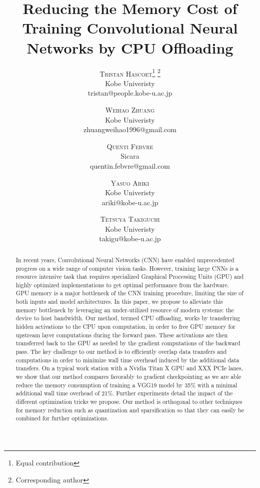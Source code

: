 \documentclass[11pt,onecolumn]{article}
\title{Reducing the Memory Cost of Training Convolutional Neural Networks by CPU Offloading} %
\author{%
	\textsc{Tristan Hascoet}\thanks{Equal contribution} \thanks{Corresponding author} \\ %
	\normalsize Kobe Univeristy \\ %
	\normalsize tristan@people.kobe-u.ac.jp %
	\and %
	\textsc{Weihao Zhuang}\footnotemark[1] \\ %
	\normalsize Kobe Univeristy \\ %
	\normalsize zhuangweihao1996@gmail.com %
	\and %
	\textsc{Quenti Febvre} \\ %
    \normalsize Sicara \\ %
    \normalsize quentin.febvre@gmail.com  %
    \and %
    \textsc{Yasuo Ariki} \\ %
    \normalsize Kobe Univeristy \\ %
	\normalsize ariki@kobe-u.ac.jp %
	\and %
    \textsc{Tetsuya Takiguchi} \\ %
    \normalsize Kobe Univeristy \\ %
	\normalsize takigu@kobe-u.ac.jp %
}
\date{\vspace{-1ex}}
\begin{document}
	
\maketitle
	
\begin{abstract}

In recent years, Convolutional Neural Networks (CNN) have enabled 
unprecedented progress on a wide range of computer vision tasks. 
However, training large CNNs is a resource intensive task that requires 
specialized Graphical Processing Units (GPU) and highly optimized 
implementations to get optimal performance from the hardware. 
GPU memory is a major bottleneck of the CNN training procedure,
 limiting  the size of both inputs and model architectures.
In this paper, we propose to alleviate this memory bottleneck by 
leveraging an under-utilized resource of modern systems: 
the device to host bandwidth.
Our method, termed CPU offloading, works by transferring hidden activations to the CPU upon
computation, in order to free GPU memory for upstream layer computations during the forward pass. 
These activations are then transferred back to the GPU as needed by the gradient computations of the backward pass.
The key challenge to our method is to efficiently overlap data transfers and computations
in order to minimize  wall time overhead induced by the additional data transfers.
On a typical work station with a Nvidia Titan X GPU and XXX PCIe lanes, 
we show that our method compares favorably to 
gradient checkpointing as we are able reduce the memory consumption of training a VGG19 model by 35\% with a minimal additional wall time overhead of 21\%. 
Further experiments detail the impact of the different optimization tricks we propose.
Our method is orthogonal to other techniques for memory reduction such as 
quantization and sparsification so that they can easily be combined for further optimizations.

\end{abstract}
\end{document}
